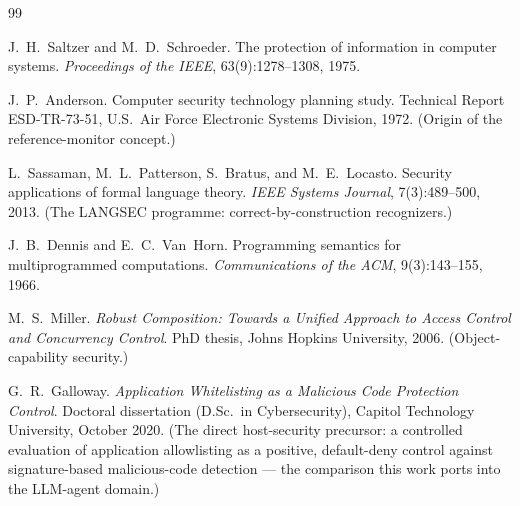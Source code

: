 \begin{thebibliography}{99}

J.~H.~Saltzer and M.~D.~Schroeder.
\newblock The protection of information in computer systems.
\newblock \emph{Proceedings of the IEEE}, 63(9):1278--1308, 1975.

J.~P.~Anderson.
\newblock Computer security technology planning study.
\newblock Technical Report ESD-TR-73-51, U.S.\ Air Force Electronic Systems Division, 1972.
\newblock (Origin of the reference-monitor concept.)

L.~Sassaman, M.~L.~Patterson, S.~Bratus, and M.~E.~Locasto.
\newblock Security applications of formal language theory.
\newblock \emph{IEEE Systems Journal}, 7(3):489--500, 2013.
\newblock (The LANGSEC programme: correct-by-construction recognizers.)

J.~B.~Dennis and E.~C.~Van~Horn.
\newblock Programming semantics for multiprogrammed computations.
\newblock \emph{Communications of the ACM}, 9(3):143--155, 1966.

M.~S.~Miller.
\newblock \emph{Robust Composition: Towards a Unified Approach to Access Control and Concurrency Control}.
\newblock PhD thesis, Johns Hopkins University, 2006.
\newblock (Object-capability security.)

G.~R.~Galloway.
\newblock \emph{Application Whitelisting as a Malicious Code Protection Control}.
\newblock Doctoral dissertation (D.Sc.\ in Cybersecurity), Capitol Technology University, October 2020.
\newblock (The direct host-security precursor: a controlled evaluation of application allowlisting as a positive, default-deny control against signature-based malicious-code detection --- the comparison this work ports into the LLM-agent domain.)


\end{thebibliography}
